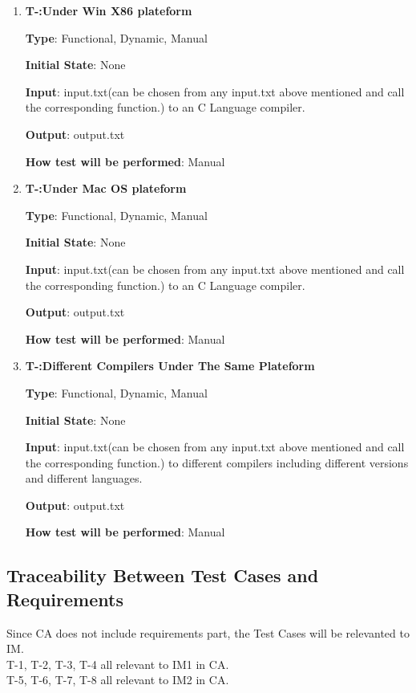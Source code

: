 \documentclass[12pt, titlepage]{article}
\newcounter{tnum}
\begin{document}
\begin{enumerate}

\item{\textbf{T-\thetnum \label{Win86}:Under Win X86 plateform}}

\textbf {Type}: Functional, Dynamic, Manual
					
\textbf {Initial State}: None
					
\textbf {Input}: input.txt(can be chosen from any input.txt above mentioned and call the corresponding function.) to an C Language compiler.
					
\textbf {Output}: output.txt
					
\textbf {How test will be performed}: Manual


\item{\textbf{T-\thetnum \label{Mac}:Under Mac OS plateform}}

\textbf {Type}: Functional, Dynamic, Manual
					
\textbf {Initial State}: None
					
\textbf {Input}:  input.txt(can be chosen from any input.txt above mentioned and call the corresponding function.) to an C Language compiler.
					
\textbf {Output}: output.txt
					
\textbf {How test will be performed}: Manual


\item{\textbf{T-\thetnum \label{Compilers}:Different Compilers Under The Same Plateform}}

\textbf {Type}: Functional, Dynamic, Manual
					
\textbf {Initial State}: None
					
\textbf {Input}:  input.txt(can be chosen from any input.txt above mentioned and call the corresponding function.) to different compilers including different versions and different languages.
					
\textbf {Output}: output.txt
					
\textbf {How test will be performed}: Manual


\end{enumerate}


\subsection{Traceability Between Test Cases and Requirements}
Since CA does not include requirements part, the Test Cases will be relevanted to IM.\\
T-1, T-2, T-3, T-4 all relevant to IM1 in CA.\\
T-5, T-6, T-7, T-8 all relevant to IM2 in CA.\\			
\end{document}
